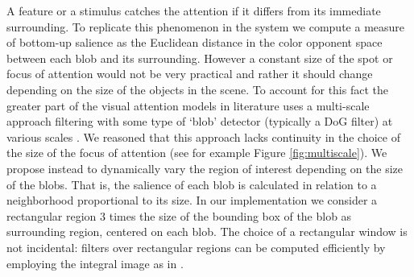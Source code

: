 \documentclass{llncs}
\begin{document}
A feature or a stimulus
catches the attention if it differs from its
immediate surrounding. To replicate this phenomenon in the system
we compute a measure of bottom-up salience as the Euclidean distance in the
color opponent space between each blob and its
surrounding. However a constant size of the spot or focus of attention
would not be very practical and rather it should change depending 
on the size of the objects in the scene. To account for this fact the greater
part of the visual attention models in literature uses a
multi-scale approach filtering with some type of `blob'
detector (typically a DoG filter) at
various scales \cite{IttiK01}. We reasoned that this approach
lacks continuity in the choice of the size of the focus of
attention (see for example Figure \ref{fig:multiscale}).
We propose instead to dynamically vary the
region of interest depending on the size of the blobs.
That is, the salience of each blob is calculated in
relation to a neighborhood proportional to its size. In
our implementation we consider a rectangular region 3
times the size of the bounding box of the blob as
surrounding region, centered on each blob. The choice
of a rectangular window is not incidental: filters
over rectangular regions can be
computed efficiently by employing the integral image
as in \cite{ViolaJ04}.
\end{document}
